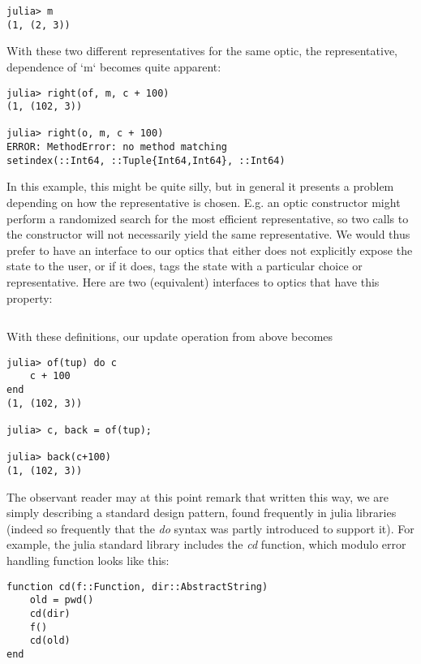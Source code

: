 \documentclass[letterpaper, 10 pt, conference]{ieeeconf}  %
\newcounter{snippet}
\begin{document}
\begin{verbatim}
julia> m
(1, (2, 3))
\end{verbatim}

With these two different representatives for the same optic, the
representative, dependence of `m` becomes quite apparent:

\begin{verbatim}
julia> right(of, m, c + 100)
(1, (102, 3))

julia> right(o, m, c + 100)
ERROR: MethodError: no method matching
setindex(::Int64, ::Tuple{Int64,Int64}, ::Int64)
\end{verbatim}

In this example, this might be quite silly, but in general it presents a
problem depending on how the representative is chosen. E.g. an optic constructor
might perform a randomized search for the most efficient representative, so two
calls to the constructor will not necessarily yield the same representative. We
would thus prefer to have an interface to our optics that either does not
explicitly expose the state to the user, or if it does, tags the state with
a particular choice or representative. Here are two (equivalent) interfaces to
optics that have this property:

\inputminted[frame=lines,framesep=2mm,fontsize=\footnotesize, xleftmargin=0.5em, mathescape, linenos, label={Snippet \arabic{snippet}}, labelposition=topline]{julia}{opticcall.jl}

With these definitions, our update operation from above becomes

\begin{verbatim}
julia> of(tup) do c
    c + 100
end
(1, (102, 3))

julia> c, back = of(tup);

julia> back(c+100)
(1, (102, 3))
\end{verbatim}

The observant reader may at this point remark that written this way, we are
simply describing a standard design pattern, found frequently in julia libraries
(indeed so frequently that the \textit{do} syntax was partly introduced to
support it). For example, the julia standard library includes the \textit{cd} function,
which modulo error handling function looks like this:

\begin{verbatim}
function cd(f::Function, dir::AbstractString)
    old = pwd()
    cd(dir)
    f()
    cd(old)
end
\end{verbatim}
\end{document}
